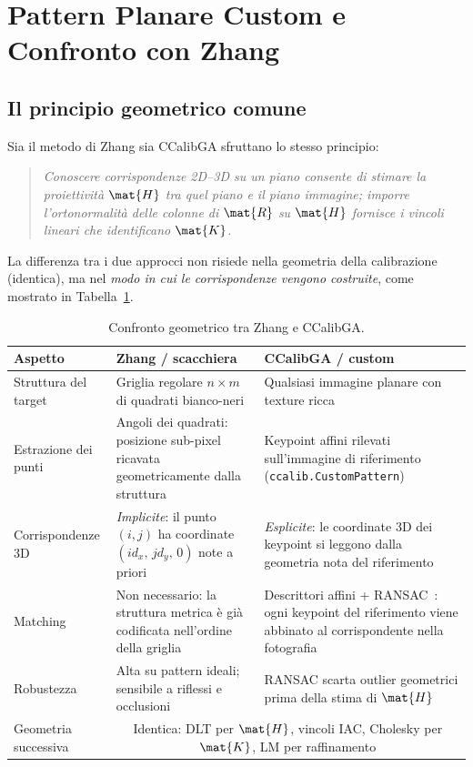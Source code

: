 \section{Pattern Planare Custom e Confronto con Zhang}
\label{sec:pattern_custom}

\subsection{Il principio geometrico comune}

Sia il metodo di Zhang sia CCalibGA sfruttano lo stesso principio:
\begin{quote}
\emph{Conoscere corrispondenze 2D--3D su un piano consente di stimare
la proiettività \(\mat{H}\) tra quel piano e il piano immagine;
imporre l'ortonormalità delle colonne di \(\mat{R}\) su \(\mat{H}\)
fornisce i vincoli lineari che identificano \(\mat{K}\).}
\end{quote}
La differenza tra i due approcci non risiede nella geometria della
calibrazione (identica), ma nel \emph{modo in cui le corrispondenze
vengono costruite}, come mostrato in Tabella~\ref{tab:confronto}.

\begin{table}[H]
\centering
\caption{Confronto geometrico tra Zhang e CCalibGA.}
\label{tab:confronto}
\begin{tabular}{p{3.2cm} p{5.0cm} p{5.0cm}}
\toprule
\textbf{Aspetto} &
\textbf{Zhang / scacchiera} &
\textbf{CCalibGA / custom} \\
\midrule
Struttura del target &
  Griglia regolare \(n{\times}m\) di quadrati bianco-neri &
  Qualsiasi immagine planare con texture ricca \\[4pt]
Estrazione dei punti &
  Angoli dei quadrati: posizione sub-pixel
  ricavata geometricamente dalla struttura &
  Keypoint affini rilevati sull'immagine di riferimento
  (\texttt{ccalib.CustomPattern}) \\[4pt]
Corrispondenze 3D &
  \emph{Implicite}: il punto \((i,j)\) ha coordinate
  \((id_x,\,jd_y,\,0)\) note a priori &
  \emph{Esplicite}: le coordinate 3D dei keypoint si
  leggono dalla geometria nota del riferimento \\[4pt]
Matching &
  Non necessario: la struttura metrica è già
  codificata nell'ordine della griglia &
  Descrittori affini + RANSAC~\cite{Fischler1981}:
  ogni keypoint del riferimento viene abbinato
  al corrispondente nella fotografia \\[4pt]
Robustezza &
  Alta su pattern ideali; sensibile a riflessi
  e occlusioni &
  RANSAC scarta outlier geometrici prima
  della stima di \(\mat{H}\) \\[4pt]
Geometria successiva &
  \multicolumn{2}{c}{Identica: DLT per \(\mat{H}\),
  vincoli IAC, Cholesky per \(\mat{K}\), LM per
  raffinamento} \\
\bottomrule
\end{tabular}
\end{table}


